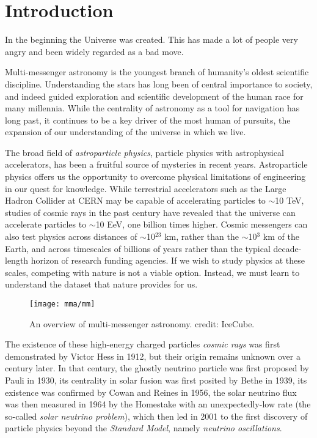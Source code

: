 \setchapterpreamble[u]{\margintoc}
\chapter{Introduction}
\begin{fquote} In the beginning the Universe was created. This has made a lot of people very angry and been widely regarded as a bad move. 
\end{fquote}

Multi-messenger astronomy is the youngest branch of humanity's oldest scientific discipline. Understanding the stars has long been of central importance to society, and indeed guided exploration and scientific development of the human race for many millennia. While the centrality of astronomy as a tool for navigation has long past, it continues to be a key driver of the most human of pursuits, the expansion of our understanding of the universe in which we live. 

The broad field of \emph{astroparticle physics}, particle physics with astrophysical accelerators, has been a fruitful source of mysteries in recent years. Astroparticle physics offers us the opportunity to overcome physical limitations of engineering in our quest for knowledge. While terrestrial accelerators such as the Large Hadron Collider at CERN may be capable of accelerating particles to $\sim$10 TeV, studies of cosmic rays in the past century have revealed that the universe can accelerate particles to $\sim$10 EeV, one billion times higher. Cosmic messengers can also test physics across distances of $\sim$10$^{23}$ km, rather than the $\sim$10$^{3}$ km of the Earth, and across timescales of billions of years rather than the typical decade-length horizon of research funding agencies. If we wish to study physics at these scales, competing with nature is not a viable option. Instead, we must learn to understand the dataset that nature provides for us.

\begin{figure}[!ht]
	\centering \texttt{[image: mma/mm]}
	\caption{An overview of multi-messenger astronomy. credit: IceCube.}
	\label{fig:mm}
\end{figure}

The existence of these high-energy charged particles \emph{cosmic rays} was first demonstrated by Victor Hess in 1912, but their origin remains unknown over a century later. In that century, the ghostly neutrino particle was first proposed by Pauli in 1930, its centrality in solar fusion was first posited by Bethe in 1939, its existence was confirmed by Cowan and Reines in 1956, the solar neutrino flux was then measured in 1964 by the Homestake with an unexpectedly-low rate (the so-called \emph{solar neutrino problem}), which then led in 2001 to the first discovery of particle physics beyond the \emph{Standard Model}, namely \emph{neutrino oscillations}. 

